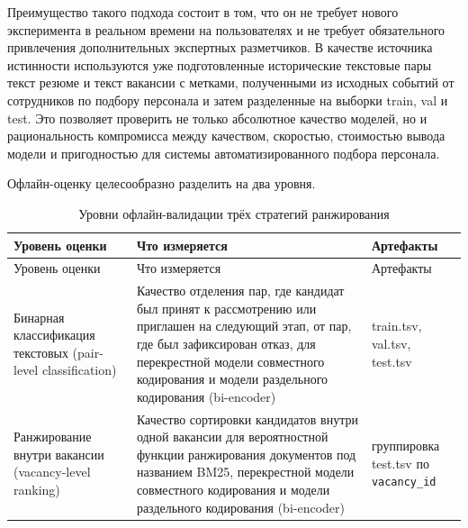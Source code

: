 Преимущество такого подхода состоит в том, что он не требует нового эксперимента в реальном времени на пользователях и не требует обязательного привлечения дополнительных экспертных разметчиков. В качестве источника истинности используются уже подготовленные исторические текстовые пары текст резюме и текст вакансии с метками, полученными из исходных событий от сотрудников по подбору персонала и затем разделенные на выборки train, val и test. Это позволяет проверить не только абсолютное качество моделей, но и рациональность компромисса между качеством, скоростью, стоимостью вывода модели и пригодностью для системы автоматизированного подбора персонала.

Офлайн-оценку целесообразно разделить на два уровня.

\begin{small}
\begin{longtable}{|P{0.30\textwidth}|P{0.34\textwidth}|P{0.28\textwidth}|}
\caption{Уровни офлайн-валидации трёх стратегий ранжирования}\label{tbl:offline}\\
\hline
Уровень оценки & Что измеряется & Артефакты \\
\hline
\endfirsthead
\hline
Уровень оценки & Что измеряется & Артефакты \\
\hline
\endhead
\hline
\endfoot
\hline
\endlastfoot
Бинарная классификация текстовых (pair-level classification) & Качество отделения пар, где кандидат был принят к рассмотрению или приглашен на следующий этап, от пар, где был зафиксирован отказ, для перекрестной модели совместного кодирования и модели раздельного кодирования (bi-encoder) & train.tsv, val.tsv, test.tsv \\
\hline
Ранжирование внутри вакансии (vacancy-level ranking) & Качество сортировки кандидатов внутри одной вакансии для вероятностной функции ранжирования документов под названием BM25, перекрестной модели совместного кодирования и модели раздельного кодирования (bi-encoder) & группировка test.tsv по \texttt{vacancy\_id} \\
\end{longtable}
\end{small}

